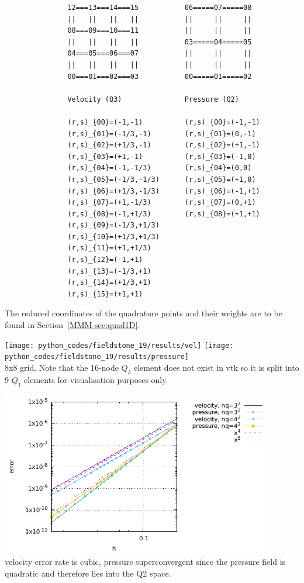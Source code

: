 \begin{verbatim}
               12===13===14===15           06=====07=====08
               ||   ||   ||   ||           ||     ||     ||
               08===09===10===11           ||     ||     ||
               ||   ||   ||   ||           03=====04=====05
               04===05===06===07           ||     ||     ||
               ||   ||   ||   ||           ||     ||     ||
               00===01===02===03           00=====01=====02

               Velocity (Q3)               Pressure (Q2)

               (r,s)_{00}=(-1,-1)          (r,s)_{00}=(-1,-1) 
               (r,s)_{01}=(-1/3,-1)        (r,s)_{01}=(0,-1) 
               (r,s)_{02}=(+1/3,-1)        (r,s)_{02}=(+1,-1) 
               (r,s)_{03}=(+1,-1)          (r,s)_{03}=(-1,0) 
               (r,s)_{04}=(-1,-1/3)        (r,s)_{04}=(0,0) 
               (r,s)_{05}=(-1/3,-1/3)      (r,s)_{05}=(+1,0) 
               (r,s)_{06}=(+1/3,-1/3)      (r,s)_{06}=(-1,+1) 
               (r,s)_{07}=(+1,-1/3)        (r,s)_{07}=(0,+1) 
               (r,s)_{08}=(-1,+1/3)        (r,s)_{08}=(+1,+1) 
               (r,s)_{09}=(-1/3,+1/3)
               (r,s)_{10}=(+1/3,+1/3)
               (r,s)_{11}=(+1,+1/3)
               (r,s)_{12}=(-1,+1)
               (r,s)_{13}=(-1/3,+1)
               (r,s)_{14}=(+1/3,+1)
               (r,s)_{15}=(+1,+1)
\end{verbatim}

The reduced coordinates of the quadrature points and their weights are to be found in 
Section~\ref{MMM-sec:quad1D}.

\begin{center}
\texttt{[image: python\_codes/fieldstone\_19/results/vel]}
\texttt{[image: python\_codes/fieldstone\_19/results/pressure]}\\
{\captionfont 8x8 grid. Note that the 16-node $Q_3$ element does not exist in vtk so it is split into 
9 $Q_1$ elements for visualisation purposes only.}
\end{center}

\begin{center}
\includegraphics[width=12cm]{python_codes/fieldstone_19/results/errors}\\
{\captionfont velocity error rate is cubic, pressure superconvergent since the pressure field
is quadratic and therefore lies into the Q2 space.}
\end{center}

